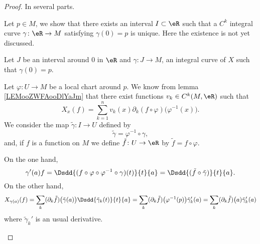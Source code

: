 \begin{proof}
	In several parts.
	\begin{subproof}
		        \label{ITEMooZPSEooPivDiw}

		Let \( p\in M\), we show that there exists an interval \( I\subset \eR\) such that a \( C^k\) integral curve \( \gamma\colon \eR\to M\) satisfying \( \gamma(0)=p\) is unique. Here the existence is not yet discussed.

		Let \( J\) be an interval around \( 0\) in \( \eR\) and \( \gamma\colon J \to M\), an integral curve of \( X\) such that \( \gamma(0)=p\).

		Let \( \varphi\colon U\to M\) be a local chart around \( p\). We know from lemma \ref{LEMooZWFAooDlYaJm} that there exist functions \( v_k\in C^k(M,\eR)\) such that
		\begin{equation}
			X_x(f)=\sum_{k=1}^nv_k(x)\partial_k(f\circ \varphi)\big( \varphi^{-1}(x) \big).
		\end{equation}
		We consider the map \( \tilde \gamma\colon I\to U\) defined by
		\begin{equation}
			\tilde \gamma=\varphi^{-1}\circ \gamma,
		\end{equation}
		and, if \( f\) is a function on \( M\) we define \( \tilde f\colon U\to \eR\) by \( \tilde f=f\circ\varphi\).

		On the one hand,
		\begin{equation}
			\gamma'(a)f=\Dsdd{ (f\circ \varphi\circ\varphi^{-1}\circ\gamma)(t) }{t}{a}=\Dsdd{ (\tilde f\circ\tilde \gamma) }{t}{a}.
		\end{equation}
		On the other hand,
		\begin{equation}
			X_{\gamma(a)}(f)=\sum_k(\partial_k\tilde f)\big( \tilde \gamma(a) \big)\Dsdd{ \tilde \gamma_k(t) }{t}{a}=\sum_k(\partial_k\tilde f)\big( \varphi^{-1}(p) \big)\tilde \gamma'_k(a)=\sum_k(\partial_k\tilde f)\big(a)\tilde \gamma'_k(a)
		\end{equation}
		where \( \tilde \gamma_k'\) is an usual derivative.


\end{subproof}
\end{proof}
